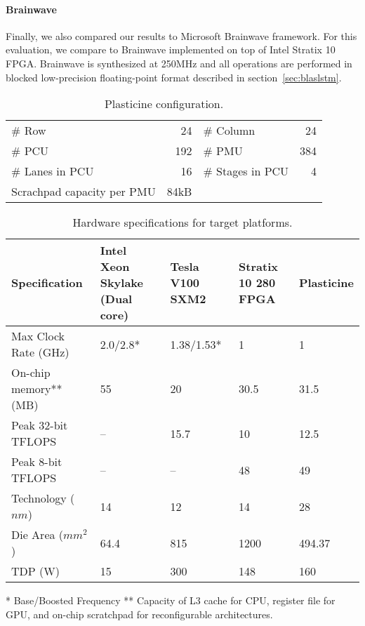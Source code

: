 \paragraph{Brainwave} Finally, we also compared our results to Microsoft Brainwave framework.
For this evaluation, we compare to Brainwave implemented
on top of Intel Stratix 10 FPGA. Brainwave is synthesized at 250MHz and all operations are performed in
blocked low-precision floating-point format described in section~\ref{sec:blaslstm}.
\begin{table}[t]
\caption{Plasticine configuration.}
\label{tab:conf}
\centering
\scriptsize
\begin{tabular}{L{3cm}rL{2.5cm}r}
\toprule
\# Row                     & 24   & \# Column        & 24  \\
\# PCU                     & 192  & \# PMU           & 384 \\
\# Lanes in PCU            & 16   & \# Stages in PCU & 4   \\
Scrachpad capacity per PMU & 84kB &                  &     \\
\bottomrule
\end{tabular}
\end{table}

\begin{table}
\caption{Hardware specifications for target platforms.}
\label{tab:spec}
\scriptsize
\centering
\begin{tabular}{L{2.5cm}M{1.2cm}M{0.8cm}M{0.8cm}M{1cm}}
\toprule
  Specification        & Intel Xeon Skylake (Dual core) & Tesla V100 SXM2 & Stratix 10 280 FPGA & Plasticine\\
\midrule
Max Clock Rate (GHz) & 2.0/2.8*                  & 1.38/1.53*      & 1                   & 1 \\
On-chip memory** (MB) & 55                        & 20              & 30.5                & 31.5\\
Peak 32-bit TFLOPS   & --                      & 15.7            & 10                  & 12.5\\
Peak 8-bit TFLOPS    & --                        & --              & 48                  & 49\\
Technology ($nm$)    & 14                        & 12              & 14                  & 28\\
Die Area ($mm^2$)    & 64.4                      & 815             & 1200                & 494.37 \\
  TDP (W)    & 15                      & 300             & 148                & 160 \\
\bottomrule
\end{tabular}
* Base/Boosted Frequency
** Capacity of L3 cache for CPU, register file for GPU, and on-chip scratchpad for reconfigurable architectures.
\end{table}

